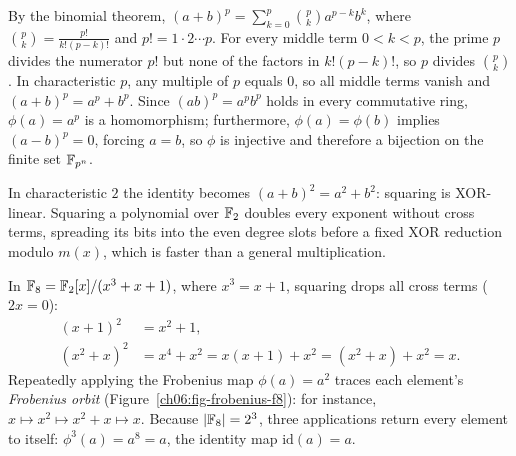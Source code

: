 \begin{whybox}
By the binomial theorem, $(a+b)^p = \sum_{k=0}^{p} \binom{p}{k} a^{p-k} b^k$,
where $\binom{p}{k} = \frac{p!}{k!(p-k)!}$ and $p! = 1 \cdot 2 \cdots p$. For
every middle term $0 < k < p$, the prime $p$ divides the numerator $p!$ but
none of the factors in $k!(p-k)!$, so $p$ divides $\binom{p}{k}$. In
characteristic $p$, any multiple of $p$ equals $0$, so all middle terms vanish
and $(a+b)^p = a^p + b^p$. Since $(ab)^p = a^p b^p$ holds in every commutative
ring, $\phi(a) = a^p$ is a homomorphism; furthermore, $\phi(a) = \phi(b)$
implies $(a-b)^p = 0$, forcing $a = b$, so $\phi$ is injective and therefore a
bijection on the finite set $\mathbb{F}_{p^n}$.

In characteristic $2$ the identity becomes $(a+b)^2 = a^2 + b^2$: squaring is
XOR-linear. Squaring a polynomial over $\mathbb{F}_2$ doubles every exponent without
cross terms, spreading its bits into the even degree slots before a fixed XOR
reduction modulo $m(x)$, which is faster than a general multiplication.
\end{whybox}

\begin{example}
\label{ch06:ex-square}
In $\mathbb{F}_8 = \mathbb{F}_2[x]/(x^3+x+1)$, where $x^3 = x+1$, squaring drops all cross
terms ($2x = 0$):
\begin{align*}
(x+1)^2 &= x^2 + 1, \\
(x^2+x)^2 &= x^4 + x^2 = x(x+1) + x^2 = (x^2 + x) + x^2 = x.
\end{align*}
Repeatedly applying the Frobenius map $\phi(a) = a^2$ traces each element's
\emph{Frobenius orbit} (Figure~\ref{ch06:fig-frobenius-f8}): for instance,
$x \mapsto x^2 \mapsto x^2 + x \mapsto x$. Because $\lvert\mathbb{F}_8\rvert = 2^3$, three
applications return every element to itself: $\phi^3(a) = a^{8} = a$, the
identity map $\mathrm{id}(a) = a$.
\end{example}

